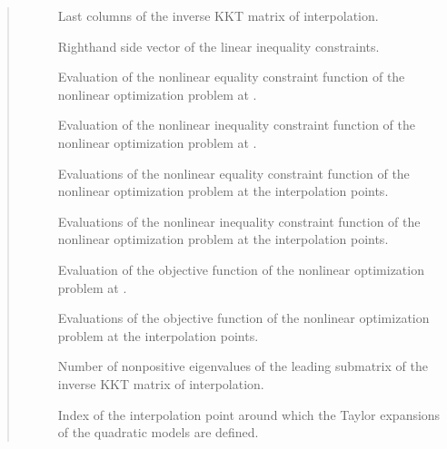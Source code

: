 \documentclass[letterpaper,10pt,english]{sphinxmanual}
\begin{document}
\begin{fulllineitems}
\begin{quote}
\begin{description}
\begin{description}
\item[{}] \leavevmode
\sphinxAtStartPar
Last  columns of the inverse KKT matrix of interpolation.

\item[{}] \leavevmode
\sphinxAtStartPar
Right\sphinxhyphen{}hand side vector of the linear inequality constraints.

\item[{}] \leavevmode
\sphinxAtStartPar
Evaluation of the nonlinear equality constraint function of the nonlinear optimization problem at .

\item[{}] \leavevmode
\sphinxAtStartPar
Evaluation of the nonlinear inequality constraint function of the nonlinear optimization problem at .

\item[{}] \leavevmode
\sphinxAtStartPar
Evaluations of the nonlinear equality constraint function of the nonlinear optimization problem at the interpolation points.

\item[{}] \leavevmode
\sphinxAtStartPar
Evaluations of the nonlinear inequality constraint function of the nonlinear optimization problem at the interpolation points.

\item[{}] \leavevmode
\sphinxAtStartPar
Evaluation of the objective function of the nonlinear optimization problem at .

\item[{}] \leavevmode
\sphinxAtStartPar
Evaluations of the objective function of the nonlinear optimization problem at the interpolation points.

\item[{}] \leavevmode
\sphinxAtStartPar
Number of nonpositive eigenvalues of the leading  submatrix of the inverse KKT matrix of interpolation.

\item[{}] \leavevmode
\sphinxAtStartPar
Index of the interpolation point around which the Taylor expansions of the quadratic models are defined.


\end{description}
\end{description}
\end{quote}
\end{fulllineitems}
\end{document}

